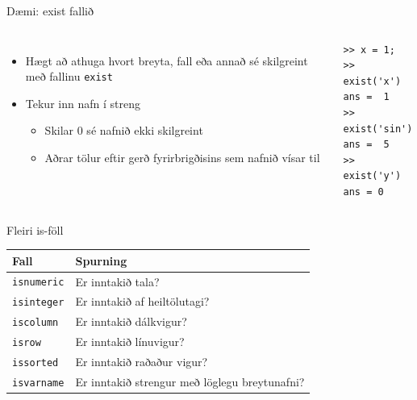 \documentclass{beamer}
\begin{document}
\begin{frame}[fragile]{Dæmi: exist fallið}
\begin{columns}
\begin{itemize}
 \item Hægt að athuga hvort breyta, fall eða annað sé skilgreint með fallinu \texttt{exist}
 \item Tekur inn nafn í streng
 \begin{itemize}
  \item Skilar 0 sé nafnið ekki skilgreint
  \item Aðrar tölur eftir gerð fyrirbrigðisins sem nafnið vísar til
 \end{itemize}
\end{itemize}
\begin{verbatim}
>> x = 1;
>> exist('x')
ans =  1
>> exist('sin')
ans =  5
>> exist('y')
ans = 0
\end{verbatim}
\end{columns}
\end{frame}

\begin{frame}{Fleiri is-föll}
\begin{center}
\begin{tabular}{ll}
\toprule
Fall&Spurning\\
\midrule
\texttt{isnumeric}&Er inntakið tala?\\
\texttt{isinteger}&Er inntakið af heiltölutagi?\\
\texttt{iscolumn}&Er inntakið dálkvigur?\\
\texttt{isrow}&Er inntakið línuvigur?\\
\texttt{issorted}&Er inntakið raðaður vigur?\\
\texttt{isvarname}&Er inntakið strengur með löglegu breytunafni?\\
\bottomrule
\end{tabular}
\end{center}
\end{frame}
\end{document}
